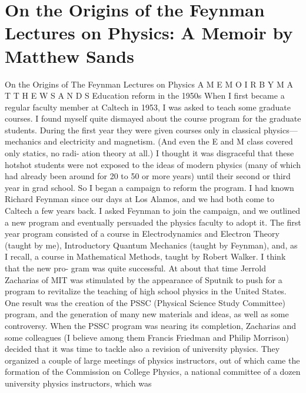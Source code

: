 \documentclass[10pt,oneside]{article}
\begin{document}
\section*{On the Origins of the Feynman Lectures on Physics: A Memoir by Matthew Sands}
\label{tips-sec-5-on-the-origins-of-the-feynman-lectures-on-physics-a-memoir-by-matthew-sands}
On the Origins of The Feynman Lectures on Physics A  M E M O I R  B Y  M A T T H E W  S A N D S Education reform in the 1950s When I first became a regular faculty member at Caltech in 1953, I was asked to teach some graduate courses. I found myself quite dismayed about the course program for the graduate students. During the first year they were given courses only in classical physics---mechanics and electricity and magnetism. (And even the E and M class covered only statics, no radi- ation theory at all.) I thought it was disgraceful that these hotshot students were not exposed to the ideas of modern physics (many of which had already been around for 20 to 50 or more years) until their second or third year in grad school. So I began a campaign to reform the program. I had known Richard Feynman since our days at Los Alamos, and we had both come to Caltech a few years back. I asked Feynman to join the campaign, and we outlined a new program and eventually persuaded the physics faculty to adopt it. The first year program consisted of a course in Electrodynamics and Electron Theory (taught by me), Introductory Quantum Mechanics (taught by Feynman), and, as I recall, a course in Mathematical Methods, taught by Robert Walker. I think that the new pro- gram was quite successful. At about that time Jerrold Zacharias of MIT was stimulated by the appearance of Sputnik to push for a program to revitalize the teaching of high school physics in the United States. One result was the creation of the PSSC (Physical Science Study Committee) program, and the generation of many new materials and ideas, as well as some controversy. When the PSSC program was nearing its completion, Zacharias and some colleagues (I believe among them Francis Friedman and Philip Morrison) decided that it was time to tackle also a revision of university physics. They organized a couple of large meetings of physics instructors, out of which came the formation of the Commission on College Physics, a national committee of a dozen university physics instructors, which was\par
\end{document}
